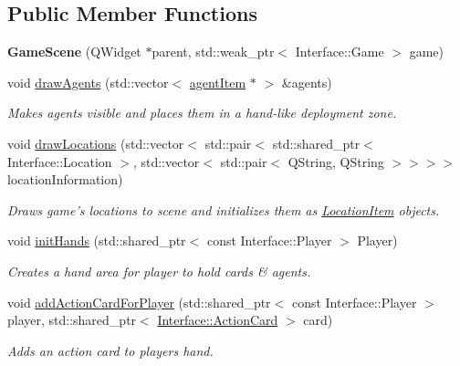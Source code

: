 \subsection*{Public Member Functions}
\begin{DoxyCompactItemize}
\item 
\hypertarget{class_game_scene_a963c269703f813ed748497a6e5a7fc4f}{{\bfseries Game\-Scene} (Q\-Widget $\ast$parent, std\-::weak\-\_\-ptr$<$ Interface\-::\-Game $>$ game)}\label{class_game_scene_a963c269703f813ed748497a6e5a7fc4f}

\item 
void \hyperlink{class_game_scene_a40a26801a9db12c1684df5fd106b5b19}{draw\-Agents} (std\-::vector$<$ \hyperlink{classagent_item}{agent\-Item} $\ast$ $>$ \&agents)
\begin{DoxyCompactList}\small\item\em Makes agents visible and places them in a hand-\/like deployment zone. \end{DoxyCompactList}\item 
void \hyperlink{class_game_scene_ae634b53a8a148208b804b7e16d16c2b6}{draw\-Locations} (std\-::vector$<$ std\-::pair$<$ std\-::shared\-\_\-ptr$<$ Interface\-::\-Location $>$, std\-::vector$<$ std\-::pair$<$ Q\-String, Q\-String $>$$>$$>$$>$ location\-Information)
\begin{DoxyCompactList}\small\item\em Draws game's locations to scene and initializes them as \hyperlink{class_location_item}{Location\-Item} objects. \end{DoxyCompactList}\item 
void \hyperlink{class_game_scene_a21620dbdbc47b5ff57dfb4ee8c96d857}{init\-Hands} (std\-::shared\-\_\-ptr$<$ const Interface\-::\-Player $>$ Player)
\begin{DoxyCompactList}\small\item\em Creates a hand area for player to hold cards \& agents. \end{DoxyCompactList}\item 
void \hyperlink{class_game_scene_a05c9687d7d9d4ca8a9b3c21eea841393}{add\-Action\-Card\-For\-Player} (std\-::shared\-\_\-ptr$<$ const Interface\-::\-Player $>$ player, std\-::shared\-\_\-ptr$<$ \hyperlink{class_interface_1_1_action_card}{Interface\-::\-Action\-Card} $>$ card)
\begin{DoxyCompactList}\small\item\em Adds an action card to players hand. \end{DoxyCompactList}\item 
$$
\end{DoxyCompactItemize}
